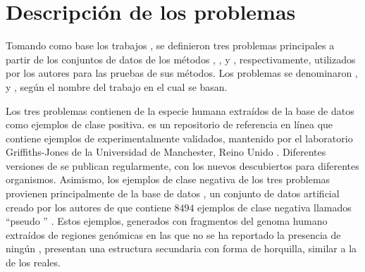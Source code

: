 %
%
%
\section{Descripción de los problemas}
%
Tomando como base los trabajos \cite{xue,ng,batuwita}, se definieron
tres problemas principales a partir de los conjuntos de datos de los
métodos \work{\tripletsvm}, \work{\mipred}, y \work{\micropred},
respectivamente, utilizados por los autores para las pruebas de sus
métodos.
Los problemas se denominaron \prob\tripletsvm{}, \prob{\mipred} y
\prob\micropred{}, según el nombre del trabajo en el cual se basan.

Los tres problemas contienen  de la especie humana
extraídos de la base de datos \dset\mirbase{} como ejemplos
de clase positiva.
\dset{\mirbase} es un repositorio de referencia en línea que contiene
ejemplos de  experimentalmente validados, mantenido por el
laboratorio Griffiths-Jones de la Universidad de Manchester, Reino
Unido \cite{mirbase1, mirbase2, mirbase3}.
Diferentes versiones de \work\mirbase{} se publican regularmente, con
los nuevos  descubiertos para diferentes organismos.
Asimismo, los ejemplos de clase negativa de los tres problemas
provienen principalmente de la base de datos , un
conjunto de datos artificial creado por los autores de
\work{\tripletsvm} que contiene $8494$ ejemplos de clase negativa
llamados ``pseudo '' \cite{xue}.
Estos ejemplos, generados con fragmentos del genoma humano extraídos
de regiones genómicas en las que no se ha reportado la presencia de
ningún \premirna{}, presentan una estructura secundaria con forma de
horquilla, similar a la de los  reales.
